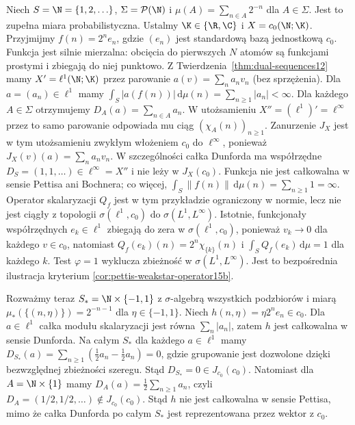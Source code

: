\begin{przyklad}
\label{ex:dunford-not-pettis15b}
Niech $S=\N=\{1,2,\ldots\}$, $\Sigma=\mathcal P(\N)$ i
$\mu(A)=\sum_{n\in A}2^{-n}$ dla $A\in\Sigma$.
Jest to zupełna miara probabilistyczna.
Ustalmy $\K\in\{\R,\C\}$ i $X=c_0(\N;\K)$.
Przyjmijmy $f(n)=2^ne_n$, gdzie $(e_n)$ jest standardową
bazą jednostkową $c_0$. Funkcja jest silnie mierzalna:
obcięcia do pierwszych $N$ atomów są funkcjami prostymi
i zbiegają do niej punktowo. Z Twierdzenia~\ref{thm:dual-sequences12}
mamy $X'=\ell^1(\N;\K)$ przez parowanie
$a(v)=\sum_n a_nv_n$ (bez sprzężenia).
Dla $a=(a_n)\in\ell^1$ mamy
$\int_S|a(f(n))|\,\mathrm d\mu(n)
=\sum_{n\ge1}|a_n|<\infty$.
Dla każdego $A\in\Sigma$ otrzymujemy
$D_A(a)=\sum_{n\in A}a_n$. W utożsamieniu
$X''=(\ell^1)'=\ell^\infty$ przez to samo parowanie
odpowiada mu ciąg $(\chi_A(n))_{n\ge1}$. Zanurzenie
$J_X$ jest w tym utożsamieniu zwykłym włożeniem $c_0$
do $\ell^\infty$, ponieważ $J_X(v)(a)=\sum_n a_nv_n$.
W szczególności całka Dunforda ma współrzędne
$D_S=(1,1,\ldots)\in\ell^\infty=X''$ i nie leży w
$J_X(c_0)$. Funkcja nie jest całkowalna w sensie Pettisa
ani Bochnera; co więcej,
$\int_S\|f(n)\|\,\mathrm d\mu(n)=\sum_{n\ge1}1=\infty$.
Operator skalaryzacji $Q_f$ jest w tym przykładzie
ograniczony w normie, lecz nie jest ciągły z topologii
$\sigma(\ell^1,c_0)$ do $\sigma(L^1,L^\infty)$.
Istotnie, funkcjonały współrzędnych $e_k\in\ell^1$
zbiegają do zera w $\sigma(\ell^1,c_0)$, ponieważ
$v_k\to0$ dla każdego $v\in c_0$, natomiast
$Q_f(e_k)(n)=2^n\chi_{\{k\}}(n)$ i
$\int_S Q_f(e_k)\,\mathrm d\mu=1$ dla każdego $k$.
Test $\varphi=1$ wyklucza zbieżność w $\sigma(L^1,L^\infty)$.
Jest to bezpośrednia ilustracja kryterium
\ref{cor:pettis-weakstar-operator15b}.

Rozważmy teraz $S_*=\N\times\{-1,1\}$ z $\sigma$-algebrą
wszystkich podzbiorów i miarą
$\mu_*(\{(n,\eta)\})=2^{-n-1}$ dla $\eta\in\{-1,1\}$.
Niech $h(n,\eta)=\eta 2^ne_n\in c_0$.
Dla $a\in\ell^1$ całka modułu skalaryzacji jest równa
$\sum_n|a_n|$, zatem $h$ jest całkowalna w sensie Dunforda.
Na całym $S_*$ dla każdego $a\in\ell^1$ mamy
$D_{S_*}(a)=\sum_{n\ge1}(\tfrac12 a_n-\tfrac12 a_n)=0$,
gdzie grupowanie jest dozwolone dzięki bezwzględnej
zbieżności szeregu. Stąd
$D_{S_*}=0\in J_{c_0}(c_0)$.
Natomiast dla $A=\N\times\{1\}$ mamy
$D_A(a)=\tfrac12\sum_{n\ge1}a_n$, czyli
$D_A=(1/2,1/2,\ldots)\notin J_{c_0}(c_0)$.
Stąd $h$ nie jest całkowalna w sensie Pettisa, mimo że
całka Dunforda po całym $S_*$ jest reprezentowana
przez wektor z $c_0$.
\end{przyklad}

